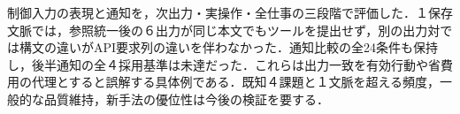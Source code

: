 制御入力の表現と通知を，次出力・実操作・全仕事の三段階で評価した．１保存文脈では，参照統一後の６出力が同じ本文でもツールを提出せず，別の出力対では構文の違いがAPI要求列の違いを伴わなかった．通知比較の全24条件も保持し，後半通知の全４採用基準は未達だった．これらは出力一致を有効行動や省費用の代理とすると誤解する具体例である．既知４課題と１文脈を超える頻度，一般的な品質維持，新手法の優位性は今後の検証を要する．
